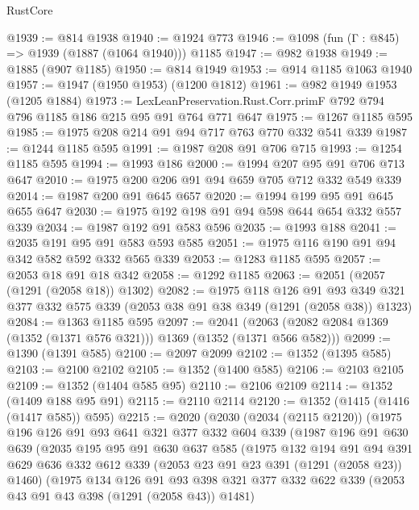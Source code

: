 \begin{lexlean}{RustCore}
\begin{coremodule}
@1939 := @814 @1938
@1940 := @1924 @773
@1946 := @1098 (fun (Γ : @845) => @1939 (@1887 (@1064 @1940))) @1185
@1947 := @982 @1938
@1949 := @1885 (@907 @1185)
@1950 := @814 @1949
@1953 := @914 @1185 @1063 @1940
@1957 := @1947 (@1950 @1953) (@1200 @1812)
@1961 := @982 @1949 @1953 (@1205 @1884)
@1973 := LexLeanPreservation.Rust.Corr.primF @792 @794 @796 @1185 @186 @215 @95 @91 @764 @771 @647
@1975 := @1267 @1185 @595
@1985 := @1975 @208 @214 @91 @94 @717 @763 @770 @332 @541 @339
@1987 := @1244 @1185 @595
@1991 := @1987 @208 @91 @706 @715
@1993 := @1254 @1185 @595
@1994 := @1993 @186
@2000 := @1994 @207 @95 @91 @706 @713 @647
@2010 := @1975 @200 @206 @91 @94 @659 @705 @712 @332 @549 @339
@2014 := @1987 @200 @91 @645 @657
@2020 := @1994 @199 @95 @91 @645 @655 @647
@2030 := @1975 @192 @198 @91 @94 @598 @644 @654 @332 @557 @339
@2034 := @1987 @192 @91 @583 @596
@2035 := @1993 @188
@2041 := @2035 @191 @95 @91 @583 @593 @585
@2051 := @1975 @116 @190 @91 @94 @342 @582 @592 @332 @565 @339
@2053 := @1283 @1185 @595
@2057 := @2053 @18 @91 @18 @342
@2058 := @1292 @1185
@2063 := @2051 (@2057 (@1291 (@2058 @18)) @1302)
@2082 := @1975
    @118
    @126
    @91
    @93
    @349
    @321
    @377
    @332
    @575
    @339
    (@2053 @38 @91 @38 @349 (@1291 (@2058 @38)) @1323)
@2084 := @1363 @1185 @595
@2097 := @2041 (@2063 (@2082 @2084 @1369 (@1352 (@1371 @576 @321))) @1369 (@1352 (@1371 @566 @582)))
@2099 := @1390 (@1391 @585)
@2100 := @2097 @2099
@2102 := @1352 (@1395 @585)
@2103 := @2100 @2102
@2105 := @1352 (@1400 @585)
@2106 := @2103 @2105
@2109 := @1352 (@1404 @585 @95)
@2110 := @2106 @2109
@2114 := @1352 (@1409 @188 @95 @91)
@2115 := @2110 @2114
@2120 := @1352 (@1415 (@1416 (@1417 @585)) @595)
@2215 := @2020
    (@2030
      (@2034 (@2115 @2120))
      (@1975
        @196
        @126
        @91
        @93
        @641
        @321
        @377
        @332
        @604
        @339
        (@1987
          @196
          @91
          @630
          @639
          (@2035
            @195
            @95
            @91
            @630
            @637
            @585
            (@1975
              @132
              @194
              @91
              @94
              @391
              @629
              @636
              @332
              @612
              @339
              (@2053 @23 @91 @23 @391 (@1291 (@2058 @23)) @1460)
              (@1975
                @134
                @126
                @91
                @93
                @398
                @321
                @377
                @332
                @622
                @339
                (@2053 @43 @91 @43 @398 (@1291 (@2058 @43)) @1481)

\end{coremodule}
\end{lexlean}
